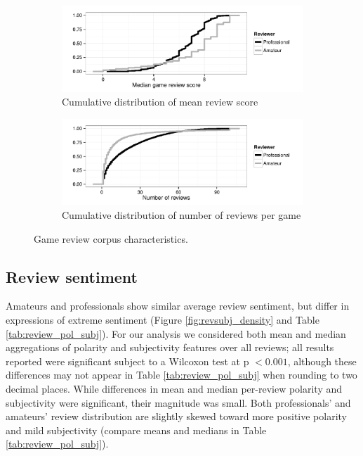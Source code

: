 \documentclass{sig-alternate}
\begin{document}
\begin{figure}[tb]
\centering


\begin{subfigure}[b]{\linewidth}
\includegraphics[width=\linewidth]{./console_games_scoremedian_ecdf}
\caption{Cumulative distribution of mean review score}
\label{fig:game_score}
\end{subfigure}
\begin{subfigure}[b]{\linewidth}
\includegraphics[width=\linewidth]{./console_games_numreviews_ecdf}
\caption{Cumulative distribution of number of reviews per game}
\label{fig:game_reviewnum}
\end{subfigure}
\caption{Game review corpus characteristics.}
\label{fig:revscore_console}
\end{figure}

\pagebreak

\subsection{Review sentiment}
Amateurs and professionals show similar average review sentiment, but differ in expressions of extreme sentiment (Figure \ref{fig:revsubj_density} and Table \ref{tab:review_pol_subj}).
For our analysis we considered both mean and median aggregations of
polarity and subjectivity features over all reviews; all results
reported were significant subject to a Wilcoxon test at p $< 0.001$, although these differences may not appear in Table \ref{tab:review_pol_subj} when rounding to two decimal places. While differences in mean and median per-review polarity and subjectivity were significant, their magnitude was small.
Both professionals' and amateurs' review distribution are slightly skewed toward more positive polarity and mild subjectivity (compare means and medians in Table \ref{tab:review_pol_subj}). 
\end{document}

